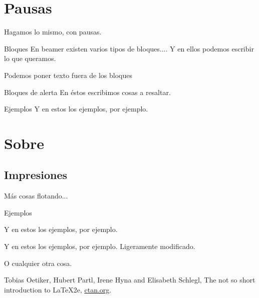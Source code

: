 \documentclass{beamer}
\begin{document}
\section{Pausas}

\begin{frame}

Hagamos lo mismo, con pausas.

\begin{block}{Bloques}
En beamer existen varios tipos de bloques....
Y en ellos podemos escribir lo que queramos.
\end{block}

\pause 
Podemos poner texto fuera de los bloques

\pause
\begin{alertblock}{Bloques de alerta}
En éstos escribimos cosas a resaltar.
\end{alertblock}

\pause
\begin{exampleblock}{Ejemplos}
Y en estos los ejemplos, por ejemplo.
\end{exampleblock}

\end{frame}

\section{Sobre}

\subsection{Impresiones}

\begin{frame}

Más cosas flotando...

\begin{exampleblock}{Ejemplos}
\begin{overprint}


Y en estos los ejemplos, por ejemplo.


Y en estos los ejemplos, por ejemplo. Ligeramente modificado.


O cualquier otra cosa.

\end{overprint}
\end{exampleblock}

\end{frame}


\begin{thebibliography}{10}
 Tobias Oetiker, Hubert Partl, Irene Hyna and Elisabeth Schlegl, The not so short introduction to \LaTeX2e, \href{http://www.ctan.org/tex-archive/info/lshort/english/lshort.pdf}{ctan.org}.
\end{thebibliography}
\end{document}
